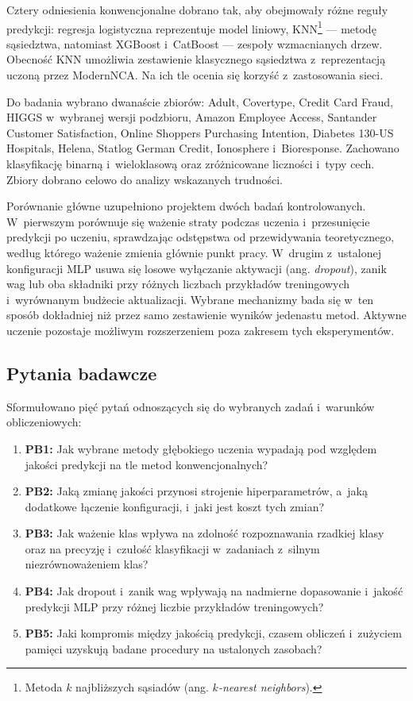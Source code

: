 Cztery odniesienia konwencjonalne dobrano tak, aby obejmowały różne reguły predykcji: regresja logistyczna reprezentuje model liniowy, KNN\footnote{Metoda $k$ najbliższych sąsiadów (ang. \textit{$k$-nearest neighbors}).} --- metodę sąsiedztwa, natomiast XGBoost i~CatBoost --- zespoły wzmacnianych drzew. Obecność KNN umożliwia zestawienie klasycznego sąsiedztwa z~reprezentacją uczoną przez ModernNCA. Na ich tle ocenia się korzyść z~zastosowania sieci.

Do badania wybrano dwanaście zbiorów: Adult, Covertype, Credit Card Fraud, HIGGS w~wybranej wersji podzbioru, Amazon Employee Access, Santander Customer Satisfaction, Online Shoppers Purchasing Intention, Diabetes 130-US Hospitals, Helena, Statlog German Credit, Ionosphere i~Bioresponse. Zachowano klasyfikację binarną i~wieloklasową oraz zróżnicowane liczności i~typy cech. Zbiory dobrano celowo do analizy wskazanych trudności.

Porównanie główne uzupełniono projektem dwóch badań kontrolowanych. W~pierwszym porównuje się ważenie straty podczas uczenia i~przesunięcie predykcji po uczeniu, sprawdzając odstępstwa od przewidywania teoretycznego, według którego ważenie zmienia głównie punkt pracy. W~drugim z~ustalonej konfiguracji MLP usuwa się losowe wyłączanie aktywacji (ang. \textit{dropout}), zanik wag lub oba składniki przy różnych liczbach przykładów treningowych i~wyrównanym budżecie aktualizacji. Wybrane mechanizmy bada się w~ten sposób dokładniej niż przez samo zestawienie wyników jedenastu metod. Aktywne uczenie pozostaje możliwym rozszerzeniem poza zakresem tych eksperymentów.

\subsection{Pytania badawcze}
\label{sec:pytania-badawcze}

Sformułowano pięć pytań odnoszących się do wybranych zadań i~warunków obliczeniowych:
\begin{enumerate}
    \item \textbf{PB1:} Jak wybrane metody głębokiego uczenia wypadają pod względem jakości predykcji na tle metod konwencjonalnych?
    \item \textbf{PB2:} Jaką zmianę jakości przynosi strojenie hiperparametrów, a~jaką dodatkowe łączenie konfiguracji, i~jaki jest koszt tych zmian?
    \item \textbf{PB3:} Jak ważenie klas wpływa na zdolność rozpoznawania rzadkiej klasy oraz na precyzję i~czułość klasyfikacji w~zadaniach z~silnym niezrównoważeniem klas?
    \item \textbf{PB4:} Jak dropout i~zanik wag wpływają na nadmierne dopasowanie i~jakość predykcji MLP przy różnej liczbie przykładów treningowych?
    \item \textbf{PB5:} Jaki kompromis między jakością predykcji, czasem obliczeń i~zużyciem pamięci uzyskują badane procedury na ustalonych zasobach?
\end{enumerate}

